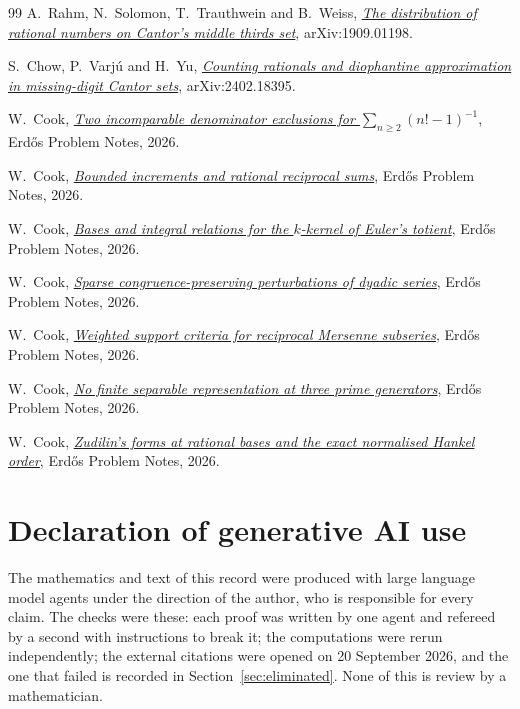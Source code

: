 \documentclass[11pt]{article}
\begin{document}
\begin{thebibliography}{99}
 A.~Rahm, N.~Solomon, T.~Trauthwein and B.~Weiss,
  \href{https://arxiv.org/abs/1909.01198}{\emph{The distribution of rational
  numbers on Cantor's middle thirds set}}, arXiv:1909.01198.

 S.~Chow, P.~Varj\'u and H.~Yu,
  \href{https://arxiv.org/abs/2402.18395}{\emph{Counting rationals and
  diophantine approximation in missing-digit Cantor sets}}, arXiv:2402.18395.

 W.~Cook,
  \href{erdos-68-factorial-denominator-irrationality.pdf}{\emph{Two
  incomparable denominator exclusions for $\sum_{n\ge2}(n!-1)^{-1}$}},
  Erd\H{o}s Problem Notes, 2026.

 W.~Cook,
  \href{erdos-243-reciprocal-tail-rigidity.pdf}{\emph{Bounded
  increments and rational reciprocal sums}}, Erd\H{o}s Problem Notes, 2026.

 W.~Cook,
  \href{erdos-249-binary-totient-series.pdf}{\emph{Bases and
  integral relations for the $k$-kernel of Euler's totient}}, Erd\H{o}s Problem
  Notes, 2026.

 W.~Cook,
  \href{erdos-251-prime-gap-dyadic-series.pdf}{\emph{Sparse
  congruence-preserving perturbations of dyadic series}}, Erd\H{o}s Problem
  Notes, 2026.

 W.~Cook,
  \href{erdos-257-mersenne-support-subseries.pdf}{\emph{Weighted
  support criteria for reciprocal Mersenne subseries}}, Erd\H{o}s Problem Notes,
  2026.

 W.~Cook,
  \href{erdos-269-three-prime-running-lcm.pdf}{\emph{No
  finite separable representation at three prime generators}}, Erd\H{o}s Problem
  Notes, 2026.

 W.~Cook,
  \href{erdos-1049-rational-base-lambert.pdf}{\emph{Zudilin's
  forms at rational bases and the exact normalised Hankel order}}, Erd\H{o}s
  Problem Notes, 2026.
\end{thebibliography}

\section*{Declaration of generative AI use}
The mathematics and text of this record were produced with large language
model agents under the direction of the author, who is responsible for every
claim.  The checks were these: each proof was written by one agent and
refereed by a second with instructions to break it; the computations were
rerun independently; the external citations were opened on 20 September 2026,
and the one that failed is recorded in Section~\ref{sec:eliminated}.  None of
this is review by a mathematician.
\end{document}

